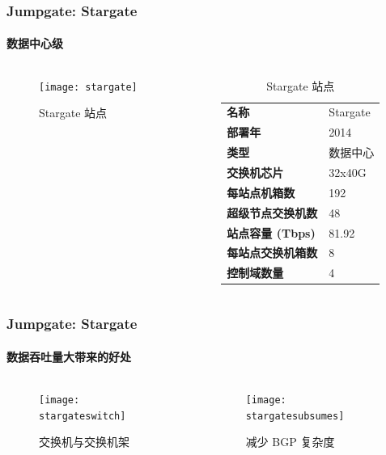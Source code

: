     \begin{frame}
        \frametitle{Jumpgate: Stargate}
        \framesubtitle{数据中心级}
        \begin{columns}
            \begin{column}{0.4\textwidth}
                \begin{figure}
                    \texttt{[image: stargate]}
                    \caption{Stargate 站点}
                \end{figure}
            \end{column}
            \begin{column}{0.6\textwidth}
                \begin{table}
                    \begin{tabular}{>{\bfseries}ll}
                        \toprule
                        名称 & Stargate \\
                        部署年 & 2014 \\
                        类型 & 数据中心 \\
                        交换机芯片 & 32x40G \\
                        每站点机箱数 & 192 \\
                        超级节点交换机数 & 48 \\
                        站点容量 (Tbps) & 81.92\\
                        每站点交换机箱数 & 8 \\
                        控制域数量 & 4 \\
                        \bottomrule
                    \end{tabular}
                    \caption{Stargate 站点}\label{tab:stargate}
                \end{table}
            \end{column}
        \end{columns}
    \end{frame}

    \begin{frame}
        \frametitle{Jumpgate: Stargate}
        \framesubtitle{数据吞吐量大带来的好处}

        \begin{columns}
            \begin{column}{0.2\textwidth}
                \begin{figure}
                    \texttt{[image: stargateswitch]}
                    \caption{交换机与交换机架}
                \end{figure}
            \end{column}
            \begin{column}{0.6\textwidth}
                \begin{figure}
                    \texttt{[image: stargatesubsumes]}
                    \caption{减少 BGP 复杂度}
                \end{figure}
            \end{column}
        \end{columns}
    \end{frame}

